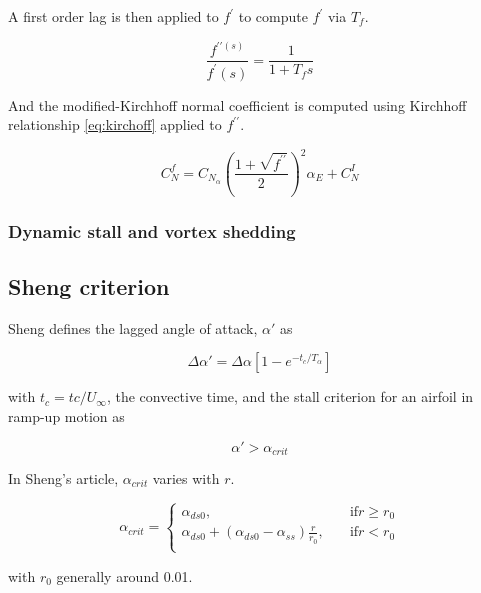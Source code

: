 A first order lag is then applied to $f^{\prime}$ to compute $f^{\prime}$ via $T_f$. 

\begin{equation}
\frac{f^{\prime \prime (s)}}{f^{\prime} (s)} = \frac{1}{1 + T_f s}
\label{•}
\end{equation}

And the modified-Kirchhoff normal coefficient is computed using Kirchhoff relationship \eqref{eq:kirchoff} applied to $f^{\prime \prime}$. 

\begin{equation}
	C_{N}^{f}=C_{N_{\alpha}}\left(\frac{1+\sqrt{f^{\prime \prime}}}{2}\right)^{2} \alpha_{E}+C_{N}^{I}\label{eq:mod_kirchoff}
\end{equation}

\subsubsection{Dynamic stall and vortex shedding}


\subsection{Sheng criterion}

Sheng defines the lagged angle of attack, $\alpha'$ as

\begin{equation}
\Delta \alpha' = \Delta \alpha\left[1-e^{-t_c/T_\alpha} \right]
\label{eq:alpha_lag}
\end{equation}

\noindent with $t_c=tc/U_{\infty}$, the convective time, and the stall criterion for an airfoil in ramp-up motion as 

\begin{equation}
\alpha' > \alpha_{crit}
\label{eq:stall_criterion}
\end{equation}

In Sheng's article, $\alpha_{crit}$ varies with $r$. 

\begin{equation}
\alpha_{crit} =
\begin{cases}
\alpha_{ds0}, &\quad \text{if} r \geq r_0 \\
\alpha_{ds0} + (\alpha_{ds0}-\alpha_{ss}) \frac{r}{r_0}, &\quad \text{if} r < r_0 \\
\end{cases}
\end{equation}

\noindent with $r_0$ generally around 0.01.

